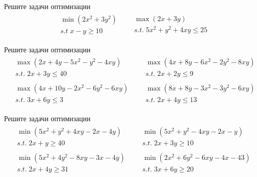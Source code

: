 
\begin{exercise}
Решите задачи оптимизации
\begin{align*}
	&\begin{gathered}
		\min(2x^2+3y^2) \\  s.t\; x-y\geq 10
	\end{gathered} &
	&\begin{gathered}
		\max (2x+3y) \\ s.t.\; 5x^2+y^2+4xy\leq 25
	\end{gathered}
\end{align*}
\end{exercise}

\begin{exercise}
Решите задачи оптимизации
\begin{align*}
	&\begin{gathered}
		\max(2x+4y-5x^2-y^2-4xy)\\ s.t.\; 2x+3y\leq 40
	\end{gathered} &
	&\begin{gathered}
		\max(4x+8y-6x^2-2y^2-8xy)\\ s.t.\; 2x+2y\leq 9
	\end{gathered} \\
	&\begin{gathered}
		\max(4x+10y-2x^2-6y^2-6xy)\\ s.t.\; 3x+6y\leq 3
	\end{gathered} &
	&\begin{gathered}
		\max(8x+8y-3x^2-3y^2-6xy)\\ s.t.\; 2x+4y\leq 13
	\end{gathered}
\end{align*}
\end{exercise}

\begin{exercise}
Решите задачи оптимизации
\begin{align*}
	&\begin{gathered}
		\min(5x^2+y^2+4xy-2x-4y)\\ s.t.\; 2x+y\geq 40
	\end{gathered} &
	&\begin{gathered}
		\min(5x^2+y^2-4xy-2x-y)\\ s.t.\; 2x+3y\geq 10
	\end{gathered} \\
	&\begin{gathered}
		\min(5x^2+4y^2-8xy-3x-4y)\\ s.t.\; 2x+4y\geq 31
	\end{gathered} &
	&\begin{gathered}
		\min(2x^2+6y^2-6xy-4x-43)\\ s.t.\; 3x+6y\geq 20
	\end{gathered}
\end{align*}
\end{exercise}

